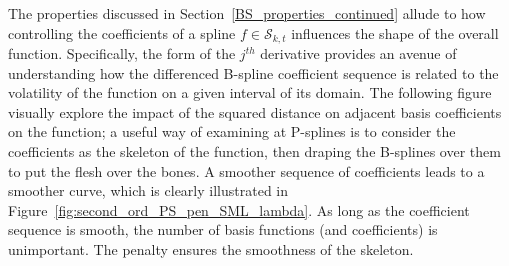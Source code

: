 \documentclass[12pt]{article}
\begin{document}
The properties discussed in Section~\ref{BS_properties_continued} allude to how controlling the coefficients of a spline $f \in \mathscr{S}_{k,t}$ influences the shape of the overall function. Specifically, the form of the $j^{th}$ derivative provides an avenue of understanding how the differenced B-spline coefficient sequence is related to the volatility of the function on a given interval of its domain. The following figure visually explore the impact of the squared distance on adjacent basis coefficients on the function; a useful way of examining at P-splines is to consider the coefficients as the skeleton of the function, then draping the B-splines over them to put the flesh over the bones. A smoother sequence of coefficients leads to a smoother curve, which is clearly illustrated in Figure~\ref{fig:second_ord_PS_pen_SML_lambda}. As long as the coefficient sequence is smooth, the number of basis functions (and coefficients) is unimportant. The penalty ensures the smoothness of the skeleton.
\end{document}
